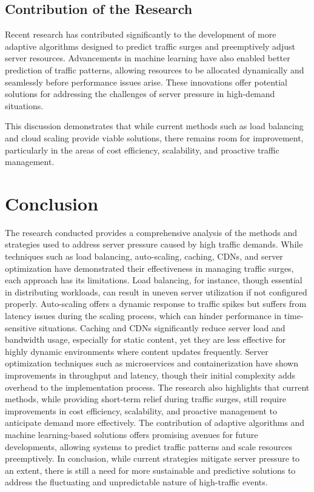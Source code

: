 \documentclass{article}
\begin{document}
\subsection{Contribution of the Research}
Recent research has contributed significantly to the development of more adaptive algorithms designed to predict traffic surges and preemptively adjust server resources. Advancements in machine learning have also enabled better prediction of traffic patterns, allowing resources to be allocated dynamically and seamlessly before performance issues arise. These innovations offer potential solutions for addressing the challenges of server pressure in high-demand situations. 

This discussion demonstrates that while current methods such as load balancing and cloud scaling provide viable solutions, there remains room for improvement, particularly in the areas of cost efficiency, scalability, and proactive traffic management.

\section{Conclusion}

The research conducted provides a comprehensive analysis of the methods and strategies used to address server pressure caused by high traffic demands. While techniques such as load balancing, auto-scaling, caching, CDNs, and server optimization have demonstrated their effectiveness in managing traffic surges, each approach has its limitations. Load balancing, for instance, though essential in distributing workloads, can result in uneven server utilization if not configured properly. Auto-scaling offers a dynamic response to traffic spikes but suffers from latency issues during the scaling process, which can hinder performance in time-sensitive situations.
Caching and CDNs significantly reduce server load and bandwidth usage, especially for static content, yet they are less effective for highly dynamic environments where content updates frequently. Server optimization techniques such as microservices and containerization have shown improvements in throughput and latency, though their initial complexity adds overhead to the implementation process.
The research also highlights that current methods, while providing short-term relief during traffic surges, still require improvements in cost efficiency, scalability, and proactive management to anticipate demand more effectively. The contribution of adaptive algorithms and machine learning-based solutions offers promising avenues for future developments, allowing systems to predict traffic patterns and scale resources preemptively.
In conclusion, while current strategies mitigate server pressure to an extent, there is still a need for more sustainable and predictive solutions to address the fluctuating and unpredictable nature of high-traffic events.
\end{document}
